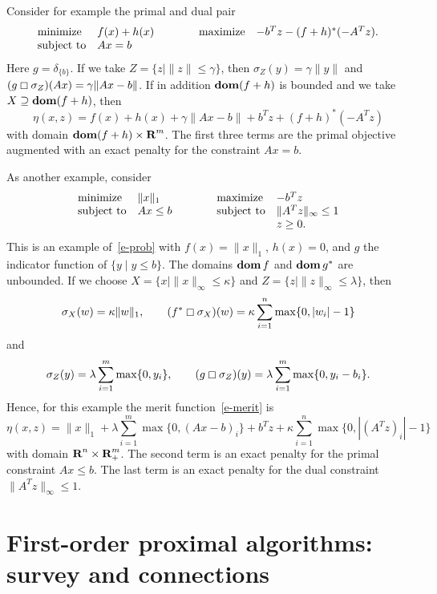 \documentclass[letterpaper,11pt]{article}
\newcommand{\dom}{\mathop{\bf dom}}
\newcommand{\reals}{{\mbox{\bf R}}}
\begin{document}
Consider for example the primal and dual pair
\[
\begin{array}[t]{ll}
  \mbox{minimize} & f(x) + h(x) \\
  \mbox{subject to} & Ax = b
\end{array} \qquad \quad
\begin{array}[t]{ll}
  \mbox{maximize} & -b^Tz - (f+h)^*(-A^Tz).
\end{array} 
\]
Here $g= \delta_{\{b\}}$.
If we take $Z = \{z \mid \|z\| \leq \gamma\}$,
then $\sigma_Z(y)=\gamma \|y\|$ and 
$(g \boxempty \sigma_Z)(Ax) = \gamma \|Ax-b\|$.
If in addition $\dom (f+h)$ is bounded and
we take $X \supseteq \dom(f+h)$, then
\[
\eta(x,z) = f(x) + h(x) + \gamma\|Ax-b\|
+ b^Tz + (f+h)^*(-A^Tz)
\]
with domain $\dom(f+h) \times \reals^m$.
The first three terms are the primal objective augmented with an
exact penalty for the constraint $Ax=b$.

As another example, consider 
\[
\begin{array}[t]{ll}
  \mbox{minimize} & \|x\|_1 \\
  \mbox{subject to} & Ax\leq b
\end{array} \qquad\quad
\begin{array}[t]{ll}
  \mbox{maximize} & -b^T z\\
  \mbox{subject to} & \|A^Tz\|_\infty \leq 1 \\
  & z \geq 0.
\end{array}
\]
This is an example of~\eqref{e-prob} with $f(x)=\|x\|_1$, $h(x)=0$,
and $g$ the indicator function of $\{y \mid y \leq b\}$.
The domains $\dom f$ and $\dom g^*$ are unbounded.
If we choose $X = \{ x \mid \|x\|_\infty \leq \kappa\}$
and $Z = \{z \mid \|z\|_\infty \leq \lambda\}$, then
\[
\sigma_X(w) = \kappa \|w\|_1, \qquad
(f^* \boxempty \sigma_X)(w)
 = \kappa \sum_{i=1}^n \max \{0, |w_i|-1\}
\]
and
\[
\sigma_Z(y) =  \lambda \sum_{i=1}^m \max\{0, y_i\}, \qquad
(g \boxempty \sigma_Z)(y) =  \lambda \sum_{i=1}^m \max\{0, y_i-b_i\}.
\]
Hence, for this example the merit function~\eqref{e-merit} is
\[
\eta(x,z) 
= \|x\|_1 + \lambda \sum_{i=1}^m \max\{0, (Ax-b)_i\}
 + b^T z  + \kappa \sum_{i=1}^n  \max\{0, |(A^Tz)_i|-1\}
\]
with domain $\reals^n \times \reals^m_+$.
The second term is an exact penalty for the primal constraint $Ax\leq b$.
The last term is an exact penalty for the dual constraint 
$\|A^Tz\|_\infty\leq 1$.


\section{First-order proximal algorithms: survey and connections}
\label{s-overview}
\end{document}
